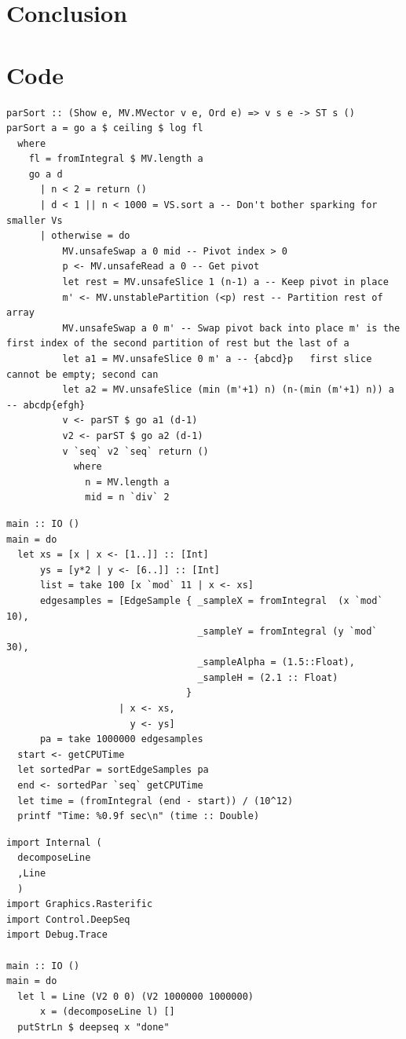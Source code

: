 \documentclass[12pt, a4paper]{article}
\begin{document}
\section{Conclusion}
\clearpage
\appendix

\section{Code}
\begin{lstlisting}[label={lst:parsort}, caption={Parallel Sorting}]
parSort :: (Show e, MV.MVector v e, Ord e) => v s e -> ST s ()
parSort a = go a $ ceiling $ log fl
  where
    fl = fromIntegral $ MV.length a
    go a d
      | n < 2 = return ()
      | d < 1 || n < 1000 = VS.sort a -- Don't bother sparking for smaller Vs
      | otherwise = do
          MV.unsafeSwap a 0 mid -- Pivot index > 0
          p <- MV.unsafeRead a 0 -- Get pivot
          let rest = MV.unsafeSlice 1 (n-1) a -- Keep pivot in place
          m' <- MV.unstablePartition (<p) rest -- Partition rest of array
          MV.unsafeSwap a 0 m' -- Swap pivot back into place m' is the first index of the second partition of rest but the last of a
          let a1 = MV.unsafeSlice 0 m' a -- {abcd}p   first slice cannot be empty; second can
          let a2 = MV.unsafeSlice (min (m'+1) n) (n-(min (m'+1) n)) a -- abcdp{efgh}
          v <- parST $ go a1 (d-1)
          v2 <- parST $ go a2 (d-1)
          v `seq` v2 `seq` return ()
            where
              n = MV.length a
              mid = n `div` 2
\end{lstlisting}%


\begin{lstlisting}[label={lst:sorting}]
main :: IO ()
main = do
  let xs = [x | x <- [1..]] :: [Int]
      ys = [y*2 | y <- [6..]] :: [Int]
      list = take 100 [x `mod` 11 | x <- xs]
      edgesamples = [EdgeSample { _sampleX = fromIntegral  (x `mod` 10),
                                  _sampleY = fromIntegral (y `mod` 30),
                                  _sampleAlpha = (1.5::Float),
                                  _sampleH = (2.1 :: Float)
                                }
                    | x <- xs,
                      y <- ys]
      pa = take 1000000 edgesamples
  start <- getCPUTime
  let sortedPar = sortEdgeSamples pa
  end <- sortedPar `seq` getCPUTime
  let time = (fromIntegral (end - start)) / (10^12)
  printf "Time: %0.9f sec\n" (time :: Double)
\end{lstlisting}

\begin{lstlisting}[caption={Decomposing a very long single line.}, label={lst:singleline}]
import Internal (
  decomposeLine
  ,Line
  )
import Graphics.Rasterific
import Control.DeepSeq
import Debug.Trace

main :: IO ()
main = do
  let l = Line (V2 0 0) (V2 1000000 1000000)
      x = (decomposeLine l) []
  putStrLn $ deepseq x "done"
\end{lstlisting}
\end{document}

